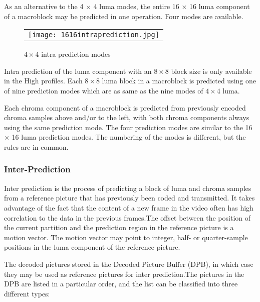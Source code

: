 \documentclass[../main.tex]{subfiles}
\begin{document}
As an alternative to the 4 × 4 luma modes, the entire 16 × 16 luma component
of a macroblock may be predicted in one operation. Four modes are available.

\begin{figure} [ht]
   \begin{center}
   \begin{tabular}{c} %
   \texttt{[image: 1616intraprediction.jpg]}
   \end{tabular}
   \end{center}
   \caption[example] 
   { \label{fig:example} 
$4 \times 4$ intra prediction modes }
   \end{figure}     %
   
Intra prediction of the luma component with an $8 \times 8$ block size is only available in the High
profiles. Each $8 \times 8$ luma block in a macroblock is predicted using one of nine
prediction modes which are as same as the nine modes of $4 \times 4$ luma.
   
Each chroma component of a macroblock is predicted from previously encoded chroma
samples above and/or to the left, with both chroma components always using the same
prediction mode. The four prediction modes are similar to the 16 × 16 luma prediction
modes. The numbering of the modes is different, but the rules are in common.
  
\subsubsection{ Inter-Prediction }

Inter prediction is the process of predicting
a block of luma and chroma samples from a reference picture that has
previously been coded and transmitted. It
takes advantage of the fact that the content of a new frame in
the video often has high correlation to the data in the
previous frames.The offset between the position of the current partition and the prediction
region in the reference picture is a motion vector. The motion vector may point to integer,
half- or quarter-sample positions in the luma component of the reference picture. 

The decoded pictures stored in the Decoded
Picture Buffer (DPB), in which case they may be used as
reference pictures for inter prediction.The pictures in the DPB are listed in a particular order, and
the list can be classified into three different types:
\end{document}
